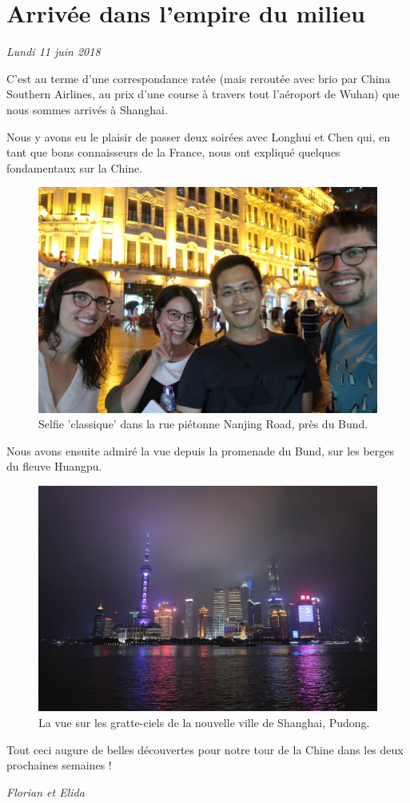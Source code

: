 \hypertarget{arrivuxe9e-dans-lempire-du-milieu}{%
\section{Arrivée dans l'empire du
milieu}\label{arrivuxe9e-dans-lempire-du-milieu}}

\emph{Lundi 11 juin 2018}

C'est au terme d'une correspondance ratée (mais reroutée avec brio par
China Southern Airlines, au prix d'une course à travers tout l'aéroport
de Wuhan) que nous sommes arrivés à Shanghai.

Nous y avons eu le plaisir de passer deux soirées avec Longhui et Chen
qui, en tant que bons connaisseurs de la France, nous ont expliqué
quelques fondamentaux sur la Chine.

\begin{figure}
\centering
\includegraphics{images/20180611_shanghai.JPG}
\caption{Selfie 'classique' dans la rue piétonne Nanjing Road, près du
Bund.}
\end{figure}

Nous avons ensuite admiré la vue depuis la promenade du Bund, sur les
berges du fleuve Huangpu.

\begin{figure}
\centering
\includegraphics{images/20180611_bund.JPG}
\caption{La vue sur les gratte-ciels de la nouvelle ville de Shanghai,
Pudong.}
\end{figure}

Tout ceci augure de belles découvertes pour notre tour de la Chine dans
les deux prochaines semaines !

\emph{Florian et Elida}
